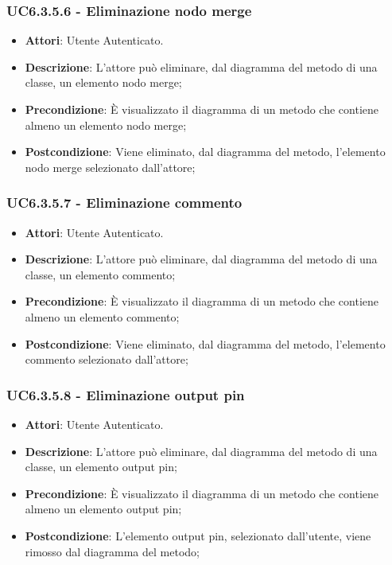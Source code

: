 \subsubsection{UC6.3.5.6 - Eliminazione nodo merge} 
\label{sssec:UC6.3.5.6} 
\begin{itemize} 
\item \textbf{Attori}: Utente Autenticato.
\item \textbf{Descrizione}: L'attore può eliminare, dal diagramma del metodo di una classe, un elemento nodo merge;
\item \textbf{Precondizione}: È visualizzato il diagramma di un metodo che contiene almeno un elemento nodo merge;
\item \textbf{Postcondizione}: Viene eliminato, dal diagramma del metodo,  l'elemento nodo merge selezionato dall'attore;
\end{itemize} 
\subsubsection{UC6.3.5.7 - Eliminazione commento} 
\label{sssec:UC6.3.5.7} 
\begin{itemize} 
\item \textbf{Attori}: Utente Autenticato.
\item \textbf{Descrizione}: L'attore può eliminare, dal diagramma del metodo di una classe, un elemento commento;
\item \textbf{Precondizione}: È visualizzato il diagramma di un metodo che contiene almeno un elemento commento;
\item \textbf{Postcondizione}: Viene eliminato, dal diagramma del metodo,  l'elemento commento selezionato dall'attore;
\end{itemize} 
\subsubsection{UC6.3.5.8 - Eliminazione output pin} 
\label{sssec:UC6.3.5.8} 
\begin{itemize} 
\item \textbf{Attori}: Utente Autenticato.
\item \textbf{Descrizione}: L'attore può eliminare, dal diagramma del metodo di una classe, un elemento output pin;
\item \textbf{Precondizione}: È visualizzato il diagramma di un metodo che contiene almeno un elemento output pin;
\item \textbf{Postcondizione}: L'elemento output pin, selezionato dall'utente, viene rimosso dal diagramma del metodo;
\end{itemize} 
